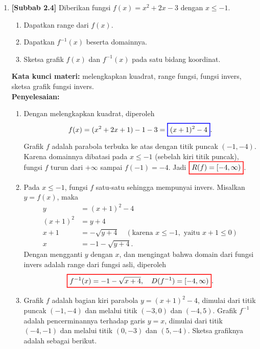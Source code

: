 \documentclass[10pt,openany,a4paper]{article}
\theoremstyle{definition}
\theoremstyle{definition}
\theoremstyle{plain}
\newenvironment{jawab}[2][tes]{%
\par\noindent\textbf{Kata kunci materi:} #1.\\
\textbf{Penyelesaian:} #2%
}{}
\begin{document}
\begin{enumerate}
    \item \textbf{[Subbab 2.4]} Diberikan fungsi $f(x)=x^2+2x-3$ dengan $x\leq -1$.
    \begin{enumerate}
        \item Dapatkan range dari $f(x)$.
        \item Dapatkan $f^{-1}(x)$ beserta domainnya.
        \item Sketsa grafik $f(x)$ dan $f^{-1}(x)$ pada satu bidang koordinat.
    \end{enumerate}
    \begin{jawab}[melengkapkan kuadrat, range fungsi, fungsi invers, sketsa grafik fungsi invers]{
        \begin{enumerate}
            \item Dengan melengkapkan kuadrat, diperoleh
            \begin{align*}
                f(x) = (x^2+2x+1)-1-3 = \colorlet{oldcolor}{.}
        \color{blue}
        \setlength{\fboxrule}{1pt} \boxed{\color{oldcolor}(x+1)^2-4}\color{oldcolor}.
            \end{align*}
            Grafik $f$ adalah parabola terbuka ke atas dengan titik puncak $(-1,-4)$. Karena domainnya dibatasi pada $x\leq -1$ (sebelah kiri titik puncak), fungsi $f$ turun dari $+\infty$ sampai $f(-1)=-4$. Jadi $\colorlet{oldcolor}{.}
        \color{red}
        \setlength{\fboxrule}{1pt} \boxed{\color{oldcolor}R(f)=[-4,\infty)}\color{oldcolor}$.
            \item Pada $x\leq -1$, fungsi $f$ satu-satu sehingga mempunyai invers. Misalkan $y=f(x)$, maka
            \begin{align*}
                y &= (x+1)^2-4\\
                (x+1)^2 &= y+4\\
                x+1 &= -\sqrt{y+4} \quad (\text{karena } x\leq -1, \text{ yaitu } x+1\leq 0)\\
                x &= -1-\sqrt{y+4}.
            \end{align*}
            Dengan mengganti $y$ dengan $x$, dan mengingat bahwa domain dari fungsi invers adalah range dari fungsi asli, diperoleh
            \begin{align*}
                \colorlet{oldcolor}{.}
        \color{red}
        \setlength{\fboxrule}{1pt} \boxed{\color{oldcolor}f^{-1}(x)=-1-\sqrt{x+4},\quad D(f^{-1})=[-4,\infty)}\color{oldcolor}.
            \end{align*}
            \item Grafik $f$ adalah bagian kiri parabola $y=(x+1)^2-4$, dimulai dari titik puncak $(-1,-4)$ dan melalui titik $(-3,0)$ dan $(-4,5)$. Grafik $f^{-1}$ adalah pencerminannya terhadap garis $y=x$, dimulai dari titik $(-4,-1)$ dan melalui titik $(0,-3)$ dan $(5,-4)$. Sketsa grafiknya adalah sebagai berikut.

\end{enumerate}}
\end{jawab}
\end{enumerate}
\end{document}

